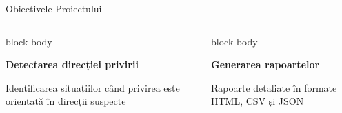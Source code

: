 \documentclass[aspectratio=169,9pt]{beamer}
\begin{document}
\begin{frame}{Obiectivele Proiectului}
        \vspace{-0.6cm}
        \begin{columns}[T]
                        \begin{beamercolorbox}[rounded=true,shadow=true,sep=1em]{block body}
                                \begin{center}
                                        {\fontsize{24}{24}\selectfont\textcolor{mainblue}{\faEye}}
                                        \vspace{0.2cm}
                                        
                                        \textbf{Detectarea direcției privirii}
                                        \vspace{0.1cm}
                                        
                                        \small Identificarea situațiilor când privirea este orientată în direcții suspecte
                                \end{center}
                        \end{beamercolorbox}
                        
                        \vspace{0.4cm}
                        
                        \begin{beamercolorbox}[rounded=true,shadow=true,sep=1em]{block body}
                                \begin{center}
                                        {\fontsize{24}{24}\selectfont\textcolor{mainblue}{\faChartBar}}
                                        \vspace{0.2cm}
                                        
                                        \textbf{Generarea rapoartelor}
                                        \vspace{0.1cm}
                                        
                                        \small Rapoarte detaliate în formate HTML, CSV și JSON
                                \end{center}
                        \end{beamercolorbox}
                        

\end{columns}
\end{frame}
\end{document}
